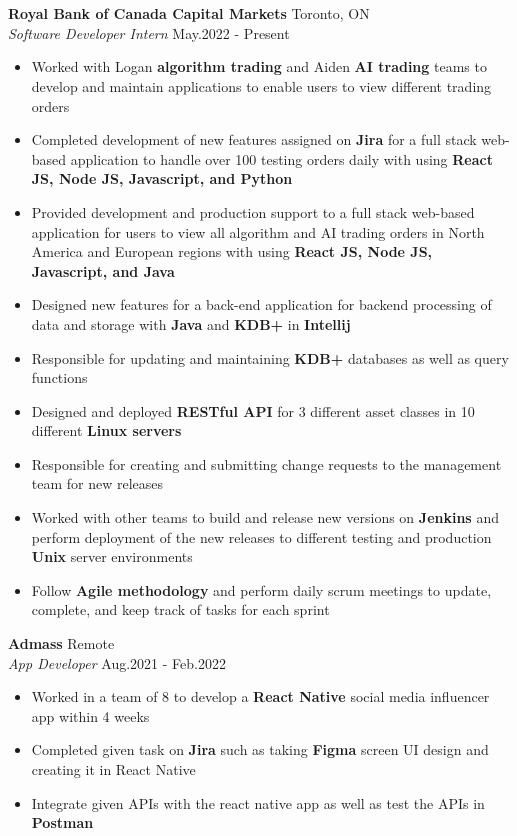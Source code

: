 \documentclass[a4paper]{article}
\newcommand{\lineunder} {
    \vspace*{-8pt} \\
    \hspace*{-18pt} \hrulefill \\
}
\newcommand{\header} [1] {
    {\hspace*{-18pt}\vspace*{6pt} \textsc{#1}}
    \vspace*{-6pt} \lineunder
}
\begin{document}
\header{\textbf{}}
\vspace{1.5mm}
\normalsize
\textbf{Royal Bank of Canada Capital Markets} \hfill Toronto, ON\\
\textit{Software Developer Intern} \hfill May.2022 - Present\\
\vspace{-2mm}
\begin{itemize} \itemsep -2pt
    \item {Worked with Logan \textbf{algorithm trading} and Aiden \textbf{AI trading} teams to develop and maintain applications to enable users to view different trading orders}
    \item {Completed development of new features assigned on \textbf{Jira} for a full stack web-based application to handle over 100 testing orders daily with using \textbf{React JS, Node JS, Javascript, and Python}}
    \item {Provided development and production support to a full stack web-based application for users to view all algorithm and AI trading orders in North America and European regions with using \textbf{React JS, Node JS, Javascript, and Java}} 
    \item{Designed new features for a back-end application for backend processing of data and storage with \textbf{Java} and \textbf{KDB+} in \textbf{Intellij}}
    \item{Responsible for updating and maintaining \textbf{KDB+} databases as well as query functions}
    \item{Designed and deployed  \textbf{RESTful API} for 3 different asset classes in 10 different \textbf{Linux servers}}
    \item{Responsible for creating and submitting change requests to the management team for new releases}
    \item{Worked with other teams to build and release new versions on \textbf{Jenkins} and perform deployment of the new releases to different testing and production \textbf{Unix} server environments}
    \item{Follow \textbf{Agile methodology} and perform daily scrum meetings to update, complete, and keep track of tasks for each sprint}
\end{itemize}

\vspace{-1mm}

\textbf{Admass} \hfill Remote\\
\textit{App Developer} \hfill Aug.2021 - Feb.2022\\
\vspace{-2mm}
\begin{itemize} \itemsep -2pt
	\item{Worked in a team of 8 to develop a \textbf{React Native} social media influencer app within 4 weeks}
    \item{Completed given task on \textbf{Jira} such as taking \textbf{Figma} screen UI design and creating it in React Native}
	\item{Integrate given APIs with the react native app as well as test the APIs in \textbf{Postman}}
\end{itemize}
\end{document}
